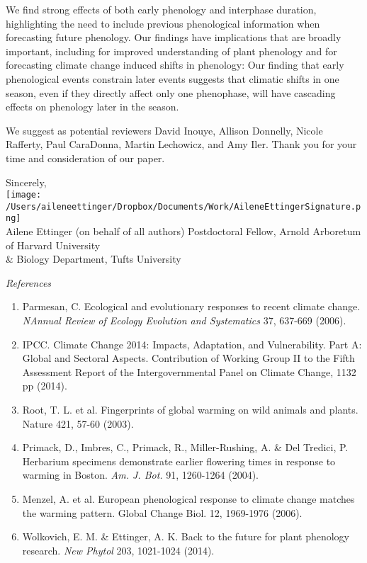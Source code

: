 \documentclass[10.95pt,a4paper]{letter}
\begin{document}
\begin{letter}{}
We find strong effects of both early phenology and interphase duration, highlighting the need to include previous phenological information when forecasting future phenology. Our findings have implications that are broadly important, including  for improved understanding of plant phenology and for forecasting climate change induced shifts in phenology: Our finding that early phenological events constrain later events suggests that climatic shifts in one season, even if they directly affect only one phenophase, will have cascading effects on phenology later in the season. 

We suggest as potential reviewers David Inouye, Allison Donnelly, Nicole Rafferty, Paul CaraDonna, Martin Lechowicz, and Amy Iler. Thank you for your time and consideration of our paper. 


Sincerely,\\

\texttt{[image: /Users/aileneettinger/Dropbox/Documents/Work/AileneEttingerSignature.png]} \\
Ailene Ettinger (on behalf of all authors)
Postdoctoral Fellow, Arnold Arboretum of Harvard University \\ \& Biology Department, Tufts University


\clearpage


\noindent \emph{References}
\begin{footnotesize}
\begin{enumerate}
\item Parmesan, C. Ecological and evolutionary responses to recent climate change.  \emph{NAnnual Review of Ecology Evolution and Systematics} 37, 637-669 (2006).
\item  IPCC. Climate Change 2014: Impacts, Adaptation, and Vulnerability. Part A: Global and Sectoral Aspects. Contribution of Working Group II to the Fifth Assessment Report of the Intergovernmental Panel on Climate Change, 1132 pp (2014).
\item Root, T. L. et al. Fingerprints of global warming on wild animals and plants. Nature 421, 57-60 (2003).
\item Primack, D., Imbres, C., Primack, R., Miller-Rushing, A. & Del Tredici, P. Herbarium specimens demonstrate earlier flowering times in response to warming in Boston.  \emph{Am. J. Bot.} 91, 1260-1264 (2004).
\item Menzel, A. et al. European phenological response to climate change matches the warming pattern. Global Change Biol. 12, 1969-1976 (2006).
\item Wolkovich, E. M. & Ettinger, A. K. Back to the future for plant phenology research. \emph{New Phytol} 203, 1021-1024 (2014).
\end{enumerate}
\end{footnotesize}



\end{letter}
\end{document}
